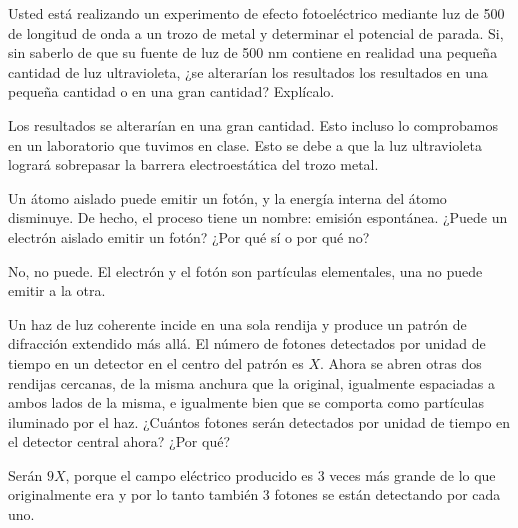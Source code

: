 





\begin{problema}
    Usted está realizando un experimento de efecto fotoeléctrico mediante luz de 500 de longitud de onda a un trozo de metal y determinar el potencial de parada. Si, sin saberlo de que su fuente de luz de 500 nm contiene en realidad una pequeña cantidad de luz ultravioleta, ¿se alterarían los resultados los resultados en una pequeña cantidad o en una gran cantidad? Explícalo.
    \begin{sol}
        Los resultados se alterarían en una gran cantidad. Esto incluso lo comprobamos en un laboratorio que tuvimos en clase. Esto se debe a que la luz ultravioleta logrará sobrepasar la barrera electroestática del trozo metal. 
    \end{sol}
\end{problema}


\begin{problema}

    Un átomo aislado puede emitir un fotón, y la energía interna del átomo disminuye. De hecho, el proceso tiene un nombre: emisión espontánea. ¿Puede un electrón aislado emitir un fotón? ¿Por qué sí o por qué no?
    \begin{sol}
        No, no puede. El electrón y el fotón son partículas elementales, una no puede emitir a la otra. 
    \end{sol}
    
    \end{problema}
    
    
    \begin{problema}
        Un haz de luz coherente incide en una sola rendija y produce un patrón de difracción extendido más allá. El número de fotones detectados por unidad de tiempo en un detector en el centro del patrón es $X$. Ahora se abren otras dos rendijas cercanas, de la misma anchura que la original, igualmente espaciadas a ambos lados de la misma, e igualmente bien que se comporta como partículas iluminado por el haz. ¿Cuántos fotones serán detectados por unidad de tiempo en el detector central ahora? ¿Por qué?
        \begin{sol}
            Serán $9X$, porque el campo eléctrico producido es 3 veces más grande de lo que originalmente era y por lo tanto también 3 fotones se están detectando por cada uno. 
        \end{sol}
    
    \end{problema}
    
